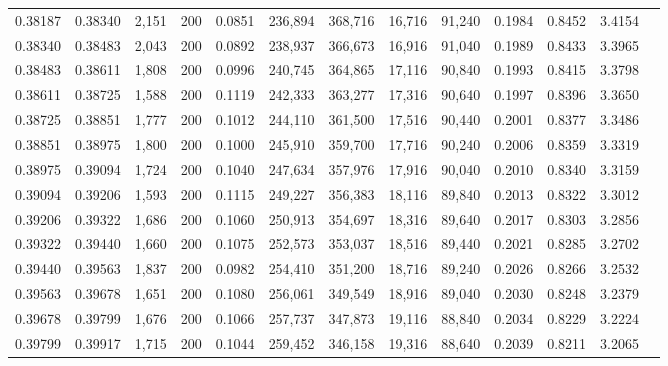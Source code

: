 \begin{tabular}{rrrrrrrrrrrrr}
0.38187 & 0.38340 & 2,151 & 200 &                                     0.0851 & 236,894 & 368,716 &  16,716 &  91,240 & 0.1984 & 0.8452 & 3.4154 \\
0.38340 & 0.38483 & 2,043 & 200 &                                     0.0892 & 238,937 & 366,673 &  16,916 &  91,040 & 0.1989 & 0.8433 & 3.3965 \\
0.38483 & 0.38611 & 1,808 & 200 &                                     0.0996 & 240,745 & 364,865 &  17,116 &  90,840 & 0.1993 & 0.8415 & 3.3798 \\
0.38611 & 0.38725 & 1,588 & 200 &                                     0.1119 & 242,333 & 363,277 &  17,316 &  90,640 & 0.1997 & 0.8396 & 3.3650 \\
0.38725 & 0.38851 & 1,777 & 200 &                                     0.1012 & 244,110 & 361,500 &  17,516 &  90,440 & 0.2001 & 0.8377 & 3.3486 \\
0.38851 & 0.38975 & 1,800 & 200 &                                     0.1000 & 245,910 & 359,700 &  17,716 &  90,240 & 0.2006 & 0.8359 & 3.3319 \\
0.38975 & 0.39094 & 1,724 & 200 &                                     0.1040 & 247,634 & 357,976 &  17,916 &  90,040 & 0.2010 & 0.8340 & 3.3159 \\
0.39094 & 0.39206 & 1,593 & 200 &                                     0.1115 & 249,227 & 356,383 &  18,116 &  89,840 & 0.2013 & 0.8322 & 3.3012 \\
0.39206 & 0.39322 & 1,686 & 200 &                                     0.1060 & 250,913 & 354,697 &  18,316 &  89,640 & 0.2017 & 0.8303 & 3.2856 \\
0.39322 & 0.39440 & 1,660 & 200 &                                     0.1075 & 252,573 & 353,037 &  18,516 &  89,440 & 0.2021 & 0.8285 & 3.2702 \\
0.39440 & 0.39563 & 1,837 & 200 &                                     0.0982 & 254,410 & 351,200 &  18,716 &  89,240 & 0.2026 & 0.8266 & 3.2532 \\
0.39563 & 0.39678 & 1,651 & 200 &                                     0.1080 & 256,061 & 349,549 &  18,916 &  89,040 & 0.2030 & 0.8248 & 3.2379 \\
0.39678 & 0.39799 & 1,676 & 200 &                                     0.1066 & 257,737 & 347,873 &  19,116 &  88,840 & 0.2034 & 0.8229 & 3.2224 \\
0.39799 & 0.39917 & 1,715 & 200 &                                     0.1044 & 259,452 & 346,158 &  19,316 &  88,640 & 0.2039 & 0.8211 & 3.2065 \\

\end{tabular}
